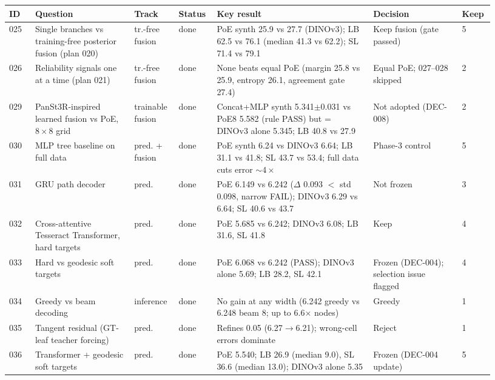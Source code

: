 \begin{table}[p]
  \centering\footnotesize
  \setlength{\tabcolsep}{2.5pt}
  \begin{tabular}{@{}p{0.05\linewidth}p{0.19\linewidth}p{0.085\linewidth}p{0.075\linewidth}p{0.305\linewidth}p{0.17\linewidth}p{0.05\linewidth}@{}}
    \toprule
    ID & Question & Track & Status & Key result & Decision & Keep \\
    \midrule
    025 & Single branches vs training-free posterior fusion (plan 020) & tr.-free fusion & done & PoE synth 25.9 vs 27.7 (DINOv3); LB 62.5 vs 76.1 (median 41.3 vs 62.2); SL 71.4 vs 79.1 & Keep fusion (gate passed) & 5 \\
    026 & Reliability signals one at a time (plan 021) & tr.-free fusion & done & None beats equal PoE (margin 25.8 vs 25.9, entropy 26.1, agreement gate 27.4) & Equal PoE; 027--028 skipped & 2 \\
    029 & PanSt3R-inspired learned fusion vs PoE, $8\times8$ grid & trainable fusion & done & Concat+MLP synth 5.341$\pm$0.031 vs PoE8 5.582 (rule PASS) but = DINOv3 alone 5.345; LB 40.8 vs 27.9 & Not adopted (DEC-008) & 2 \\
    030 & MLP tree baseline on full data & pred. + fusion & done & PoE synth 6.24 vs DINOv3 6.64; LB 31.1 vs 41.8; SL 43.7 vs 53.4; full data cuts error $\sim4\times$ & Phase-3 control & 5 \\
    031 & GRU path decoder & pred. & done & PoE 6.149 vs 6.242 ($\Delta$ 0.093 $<$ std 0.098, narrow FAIL); DINOv3 6.29 vs 6.64; SL 40.6 vs 43.7 & Not frozen & 3 \\
    032 & Cross-attentive Tesseract Transformer, hard targets & pred. & done & PoE 5.685 vs 6.242; DINOv3 6.08; LB 31.6, SL 41.8 & Keep & 4 \\
    033 & Hard vs geodesic soft targets & pred. & done & PoE 6.068 vs 6.242 (PASS); DINOv3 alone 5.69; LB 28.2, SL 42.1 & Frozen (DEC-004); selection issue flagged & 4 \\
    034 & Greedy vs beam decoding & inference & done & No gain at any width (6.242 greedy vs 6.248 beam 8; up to 6.6$\times$ nodes) & Greedy & 1 \\
    035 & Tangent residual (GT-leaf teacher forcing) & pred. & done & Refines 0.05 (6.27$\to$6.21); wrong-cell errors dominate & Reject & 1 \\
    036 & Transformer + geodesic soft targets & pred. & done & PoE 5.540; LB 26.9 (median 9.0), SL 36.6 (median 13.0); DINOv3 alone 5.35 & Frozen (DEC-004 update) & 5 \\

\end{tabular}
\end{table}
